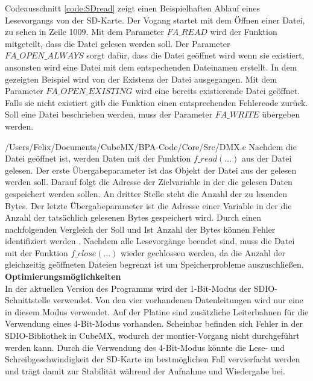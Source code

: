 Codeausschnitt \ref{code:SDread} zeigt einen Beispielhaften Ablauf eines Lesevorgangs von der SD-Karte. Der Vogang startet mit dem Öffnen einer Datei, zu sehen in Zeile 1009. Mit dem Parameter $FA\_READ$ wird der Funktion mitgeteilt, dass die Datei gelesen werden soll. Der Parameter $FA\_OPEN\_ALWAYS$ sorgt dafür, dass die Datei geöffnet wird wenn sie existiert, ansonsten wird eine Datei mit dem entspechenden Dateinamen erstellt. In dem gezeigten Beispiel wird von der Existenz der Datei ausgegangen. Mit dem Parameter $FA\_OPEN\_EXISTING$ wird eine bereits existierende Datei geöffnet. Falls sie nicht existiert gitb die Funktion einen entsprechenden Fehlercode zurück. Soll eine Datei beschrieben werden, muss der Parameter $FA\_WRITE$ übergeben werden.

{/Users/Felix/Documents/CubeMX/BPA-Code/Core/Src/DMX.c}
Nachdem die Datei geöffnet ist, werden Daten mit der Funktion $f\_read(...)$ aus der Datei gelesen. Der erste Übergabeparameter ist das Objekt der Datei aus der gelesen werden soll. Darauf folgt die Adresse der Zielvariable in der die gelesen Daten gespeichert werden sollen. An dritter Stelle steht die Anzahl der zu lesenden Bytes. Der letzte Übergabeparameter ist die Adresse einer Variable in der die Anzahl der tatsächlich gelesenen Bytes gespeichert wird. Durch einen nachfolgenden Vergleich der Soll und Ist Anzahl der Bytes können Fehler identifiziert werden \cite{FATFS}. Nachdem alle Lesevorgänge beendet sind, muss die Datei mit der Funktion $f\_close(...)$ wieder gechlossen werden, da die Anzahl der gleichzeitig geöffneten Dateien begrenzt ist um Speicherprobleme auszuschließen.\\
\textbf{Optimierungsmöglichkeiten}\\
In der aktuellen Version des Programms wird der 1-Bit-Modus der SDIO-Schnittstelle verwendet. Von den vier vorhandenen Datenleitungen wird nur eine in diesem Modus verwendet. Auf der Platine sind zusätzliche Leiterbahnen für die Verwendung eines 4-Bit-Modus vorhanden. Scheinbar befinden sich Fehler in der SDIO-Bibliothek in CubeMX, wodurch der montier-Vorgang nicht durchgeführt werden kann. Durch die Verwendung des 4-Bit-Modus könnte die Lese- und Schreibgeschwindigkeit der SD-Karte im bestmöglichen Fall vervierfacht werden und trägt damit zur Stabilität während der Aufnahme und Wiedergabe bei.